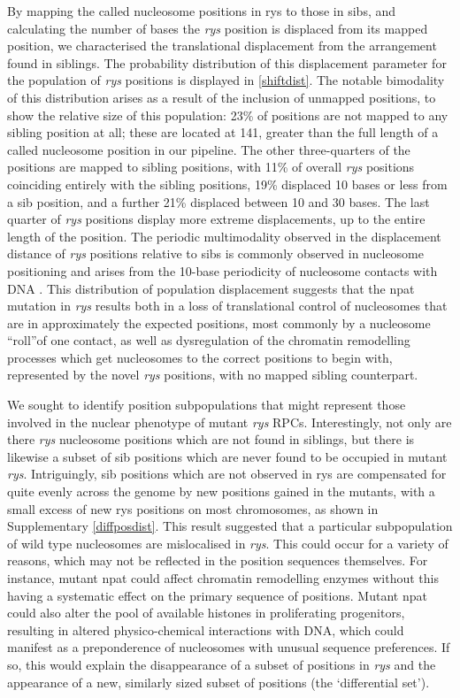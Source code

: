 By mapping the called nucleosome positions in rys to those in sibs, and calculating the number of bases the \textit{rys} position is displaced from its mapped position, we characterised the translational displacement from the arrangement found in siblings. The probability distribution of this displacement parameter for the population of \textit{rys} positions is displayed in \autoref{shiftdist}. The notable bimodality of this distribution arises as a result of the inclusion of unmapped positions, to show the relative size of this population: 23\% of positions are not mapped to any sibling position at all; these are located at 141, greater than the full length of a called nucleosome position in our pipeline. The other three-quarters of the positions are mapped to sibling positions, with 11\% of overall \textit{rys} positions coinciding entirely with the sibling positions, 19\% displaced 10 bases or less from a sib position, and a further 21\% displaced between 10 and 30 bases. The last quarter of \textit{rys} positions display more extreme displacements, up to the entire length of the position. The periodic multimodality observed in the displacement distance of \textit{rys} positions relative to sibs is commonly observed in nucleosome positioning and arises from the 10-base periodicity of nucleosome contacts with DNA \cite{Wright2017}. This distribution of population displacement suggests that the npat mutation in \textit{rys} results both in a loss of translational control of nucleosomes that are in approximately the expected positions, most commonly by a nucleosome ``roll''of one contact, as well as dysregulation of the chromatin remodelling processes which get nucleosomes to the correct positions to begin with, represented by the novel \textit{rys} positions, with no mapped sibling counterpart.

We sought to identify position subpopulations that might represent those involved in the nuclear phenotype of mutant \textit{rys} RPCs. Interestingly, not only are there \textit{rys} nucleosome positions which are not found in siblings, but there is likewise a subset of sib positions which are never found to be occupied in mutant \textit{rys}. Intriguingly, sib positions which are not observed in rys are compensated for quite evenly across the genome by new positions gained in the mutants, with a small excess of new rys positions on most chromosomes, as shown in Supplementary \autoref{diffposdist}. This result suggested that a particular subpopulation of wild type nucleosomes are mislocalised in \textit{rys}. This could occur for a variety of reasons, which may not be reflected in the position sequences themselves. For instance, mutant npat could affect chromatin remodelling enzymes without this having a systematic effect on the primary sequence of positions. Mutant npat could also alter the pool of available histones in proliferating progenitors, resulting in altered physico-chemical interactions with DNA, which could manifest as a preponderence of nucleosomes with unusual sequence preferences. If so, this would explain the disappearance of a subset of positions in \textit{rys} and the appearance of a new, similarly sized subset of positions (the `differential set').

